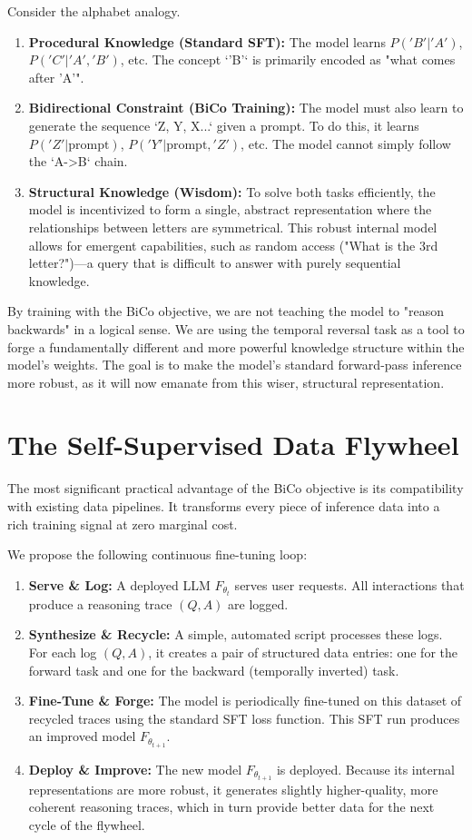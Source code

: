 \documentclass[11pt]{article}
\begin{document}
Consider the alphabet analogy.
\begin{enumerate}
    \item \textbf{Procedural Knowledge (Standard SFT):} The model learns $P('B'|'A')$, $P('C'|'A','B')$, etc. The concept `'B'` is primarily encoded as "what comes after 'A'".
    \item \textbf{Bidirectional Constraint (BiCo Training):} The model must also learn to generate the sequence `Z, Y, X...` given a prompt. To do this, it learns $P('Z'|\text{prompt})$, $P('Y'|\text{prompt}, 'Z')$, etc. The model cannot simply follow the `A->B` chain.
    \item \textbf{Structural Knowledge (Wisdom):} To solve both tasks efficiently, the model is incentivized to form a single, abstract representation where the relationships between letters are symmetrical. This robust internal model allows for emergent capabilities, such as random access ("What is the 3rd letter?")—a query that is difficult to answer with purely sequential knowledge.
\end{enumerate}

By training with the BiCo objective, we are not teaching the model to "reason backwards" in a logical sense. We are using the temporal reversal task as a tool to forge a fundamentally different and more powerful knowledge structure within the model's weights. The goal is to make the model's standard forward-pass inference more robust, as it will now emanate from this wiser, structural representation.

\section{The Self-Supervised Data Flywheel}
The most significant practical advantage of the BiCo objective is its compatibility with existing data pipelines. It transforms every piece of inference data into a rich training signal at zero marginal cost.

We propose the following continuous fine-tuning loop:
\begin{enumerate}
    \item \textbf{Serve \& Log:} A deployed LLM $F_{\theta_t}$ serves user requests. All interactions that produce a reasoning trace $(Q, A)$ are logged.
    \item \textbf{Synthesize \& Recycle:} A simple, automated script processes these logs. For each log $(Q, A)$, it creates a pair of structured data entries: one for the forward task and one for the backward (temporally inverted) task.
    \item \textbf{Fine-Tune \& Forge:} The model is periodically fine-tuned on this dataset of recycled traces using the standard SFT loss function. This SFT run produces an improved model $F_{\theta_{t+1}}$.
    \item \textbf{Deploy \& Improve:} The new model $F_{\theta_{t+1}}$ is deployed. Because its internal representations are more robust, it generates slightly higher-quality, more coherent reasoning traces, which in turn provide better data for the next cycle of the flywheel.
\end{enumerate}
\end{document}
